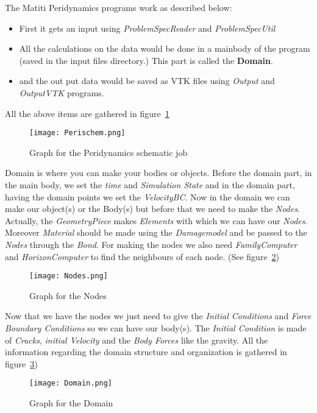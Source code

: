 \documentclass[11pt,fleqn]{book} %
\begin{document}
The Matiti Peridynamics programs work as described below:
\begin{itemize}
\item First it gets an input using \emph{ProblemSpecReader} and \emph{ProblemSpecUtil}
\item All the calculations on the data would be done in a mainbody of the program (saved in the input files directory.) This part is called the \textbf{Domain}.
\item and the out put data would be saved as VTK files using \emph{Output} and \emph{OutputVTK} programs. 
\end{itemize}

All the above items are gathered in figure~\ref{fig:Perischem}
\begin{figure}
  \texttt{[image: Perischem.png]}
  \caption{Graph for the Peridynamics schematic job}
  \label{fig:Perischem}
\end{figure}

Domain is where you can make your bodies or objects. Before the domain part, in the main body, we set the \emph{time} and \emph{Simulation State} and in the domain part, having the domain points we set the \emph{VelocityBC}. Now in the domain we can make our object(s) or the Body(s) but before that we need to make the \emph{Nodes}. \\
Actually, the \emph{GeometryPiece} makes \emph{Elements} with which we can have our \emph{Nodes}. Moreover \emph{Material} should be made using the \emph{Damagemodel} and be passed to the \emph{Nodes} through the \emph{Bond}. For making the nodes we also need \emph{FamilyComputer} and \emph{HorizonComputer} to find the neighbours of each node. (See figure~\ref{fig:Nodes})
\begin{figure}
  \texttt{[image: Nodes.png]}
  \caption{Graph for the Nodes}
  \label{fig:Nodes}
\end{figure}

Now that we have the nodes we just need to give the \emph{Initial Conditions} and \emph{Force Boundary Conditions} so we can have our body(s). The \emph{Initial Condition} is made of \emph{Cracks}, \emph{initial Velocity} and the \emph{Body Forces} like the gravity.
All the information regarding the domain structure and organization is gathered in figure~\ref{fig:Domain})
\begin{figure}
  \texttt{[image: Domain.png]}
  \caption{Graph for the Domain}
  \label{fig:Domain}
\end{figure}
\end{document}
